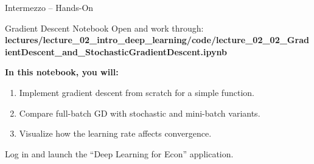 \documentclass[aspectratio=169,11pt]{beamer}
\begin{document}
\begin{frame}{Intermezzo -- Hands-On}
\begin{block}{Gradient Descent Notebook}
Open and work through: \textbf{lectures/lecture\_02\_intro\_deep\_learning/code/lecture\_02\_02\_GradientDescent\_and\_StochasticGradientDescent.ipynb}
\end{block}

\vspace{0.5cm}
\textbf{In this notebook, you will:}
\begin{enumerate}
    \item Implement gradient descent from scratch for a simple function.
    \item Compare full-batch GD with stochastic and mini-batch variants.
    \item Visualize how the learning rate affects convergence.
\end{enumerate}

\vspace{0.5cm}
\begin{center}
{\small Log in and launch the ``Deep Learning for Econ'' application.}
\end{center}
\end{frame}
\end{document}

